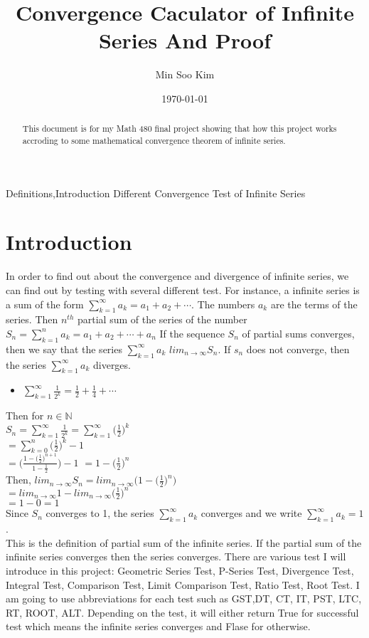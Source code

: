 \documentclass[12pt]{article}
\title{Convergence Caculator of Infinite Series And Proof}
\author{Min Soo Kim}
\date{\today}
\begin{document}
\maketitle
\tableofcontents{}
\newpage
Definitions,Introduction Different Convergence Test of Infinite Series
\begin{abstract}
This document is for my Math 480 final project showing that how this project works accroding to some mathematical convergence theorem of infinite series.
\end{abstract}
\section{Introduction}
In order to find out about the convergence and divergence of infinite series, we can find out by testing with several different test. For instance, a infinite series is a sum of the form $\displaystyle\sum_{k=1}^{\infty}a_k=a_1+a_2+\cdots$. The numbers $a_k$ are the terms of the series. Then $n^{th}$ partial sum of the series of the number
$S_n=\displaystyle\sum_{k=1}^{n}a_k=a_1+a_2+\cdots+a_n$\newline
If the sequence ${S_n}$ of partial sums converges, then we say that the series $\displaystyle\sum_{k=1}^{\infty}a_k$ $lim_{n\to\infty}S_n$.
If ${s_n}$ does not converge, then the series $\displaystyle\sum_{k=1}^{\infty}a_k$ diverges.
\begin{itemize}
\item $\displaystyle\sum_{k=1}^{\infty}\frac{1}{2^k}=\frac{1}{2}+\frac{1}{4}+\cdots$
\end{itemize}
Then for $n\in \mathbb{N}$ \\
$S_n=\displaystyle\sum_{k=1}^{\infty}\frac{1}{2^k}=\displaystyle\sum_{k=1}^{\infty}\big(\frac{1}{2}\big)^k$\\
$=\displaystyle\sum_{k=0}^{n}\big(\frac{1}{2}\big)^k-1$\\
$=\big(\frac{1-(\frac{1}{2}\big)^{n+1}}{1-\frac{1}{2}}\big)-1$\newline
$=1-\big(\frac{1}{2}\big)^n$\\
Then, $lim_{n\to\infty}S_n=lim_{n\to\infty}\big(1-\big(\frac{1}{2}\big)^n\big)$\\
$=lim_{n\to\infty}1-lim_{n\to\infty}\big(\frac{1}{2}\big)^n$\\
$=1-0=1$\\
Since ${S_n}$ converges to 1, the series $\displaystyle\sum_{k=1}^{\infty}a_k$ converges and we write $\displaystyle\sum_{k=1}^{\infty}a_k=1$.\\
This is the definition of partial sum of the infinite series. If the partial sum of the infinite series converges then the series converges. There are various test I will introduce in this project: Geometric Series Test, P-Series Test, Divergence Test, Integral Test, Comparison Test, Limit Comparison Test, Ratio Test, Root Test. I am going to use abbreviations for each test such as GST,DT, CT, IT, PST, LTC, RT, ROOT, ALT. Depending on the test, it will either return True for successful test which means the infinite series converges and Flase for otherwise.\newline
\end{document}
